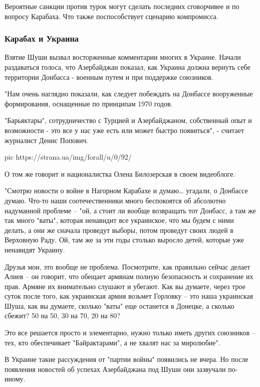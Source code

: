 Вероятные санкции против турок могут сделать последних сговорчивее и по вопросу
Карабаха. Что также поспособствует сценарию компромисса. 

\subsubsection{Карабах и Украина}

Взятие Шуши вызвал восторженные комментарии многих в Украине. Начали
раздаваться голоса, что Азербайджан показал, как Украина должна вернуть себе
территории Донбасса - военным путем и при поддержке союзников.

"Нам очень наглядно показали, как следует побеждать на Донбассе вооруженные
формирования, оснащенные по принципам 1970 годов.

"Барьяктары", сотрудничество с Турцией и Азербайджаном, собственный опыт и
возможности - это все у нас уже есть или может быстро появиться", - считает
журналист Денис Попович.

\ifcmt
pic https://strana.ua/img/forall/u/0/92/%
\fi

О том же говорит и националистка Олена Билозерская в своем видеоблоге. 

"Смотрю новости о войне в Нагорном Карабахе и думаю… угадали, о Донбассе думаю.
Что-то наши соотечественники много беспокоятся об абсолютно надуманной проблеме
– "ой, а стоит ли вообще возвращать тот Донбасс, а там же так много "ваты",
которая ненавидит все украинское, что мы будем с ними делать, а они же сначала
проведут выборы, потом проведут своих людей в Верховную Раду. Ой, там же за эти
годы столько выросло детей, которые уже ненавидят Украину.

Друзья мои, это вообще не проблема. Посмотрите, как правильно сейчас делает
Алиев – он говорит, что обещает армянам полную безопасность и сохранение их
прав. Армяне их внимательно слушают и убегают. Как вы думаете, через трое суток
после того, как украинская армия возьмет Горловку – это наша украинская Шуша,
как вы думаете, сколько "ваты" еще останется в Донецке, а сколько сбежит? 50 на
50, 30 на 70, 20 на 80?

Это все решается просто и элементарно, нужно только иметь других союзников –
тех, кто обеспечивает "Байрактарами", а не хвалят нас за миролюбие".


В Украине такие рассуждения от "партии войны" появились не вчера. Но после
появления новостей об успехах Азербайджана под Шуши они зазвучали по-иному.

